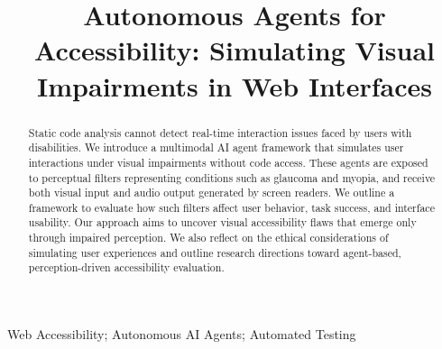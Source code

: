 \documentclass[10pt, conference]{IEEEtran}
\begin{document}
\title{Autonomous Agents for Accessibility: Simulating Visual Impairments in Web Interfaces}

\author{
\and
{}
}

\maketitle

\begin{abstract}
Static code analysis cannot detect real-time interaction issues faced by users with disabilities. We introduce a multimodal AI agent framework that simulates user interactions under visual impairments without code access. These agents are exposed to perceptual filters representing conditions such as glaucoma and myopia, and receive both visual input and audio output generated by screen readers. We outline a framework to evaluate how such filters affect user behavior, task success, and interface usability. Our approach aims to uncover visual accessibility flaws that emerge only through impaired perception. We also reflect on the ethical considerations of simulating user experiences and outline research directions toward agent-based, perception-driven accessibility evaluation.
\end{abstract}

\begin{IEEEkeywords}
Web Accessibility; Autonomous \ac{AI} Agents; Automated Testing
\end{IEEEkeywords}









\balance


\end{document}
